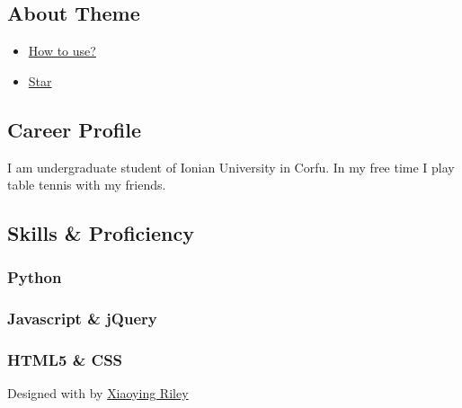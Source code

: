 \documentclass[
]{article}
\providecommand{\tightlist}{%
  \setlength{\itemsep}{0pt}\setlength{\parskip}{0pt}}
\begin{document}
\hypertarget{about-theme}{%
\subsection{About Theme}\label{about-theme}}

\begin{itemize}
\tightlist
\item
  \href{https://www.youtube.com/watch?v=Jnmj1dXDbNk}{How to use?}
\item
  \href{https://github.com/sharu725/online-cv}{Star}
\end{itemize}

\hypertarget{career-profile}{%
\subsection{\texorpdfstring{{ \emph{} \emph{} } Career
Profile}{    Career Profile}}\label{career-profile}}

I am undergraduate student of Ionian University in Corfu. In my free
time I play table tennis with my friends.

\hypertarget{skills-proficiency}{%
\subsection{\texorpdfstring{{ \emph{} \emph{} } Skills \&
Proficiency}{    Skills \& Proficiency}}\label{skills-proficiency}}

\hypertarget{python}{%
\subsubsection{Python}\label{python}}

\hypertarget{javascript-jquery}{%
\subsubsection{Javascript \& jQuery}\label{javascript-jquery}}

\hypertarget{html5-css}{%
\subsubsection{HTML5 \& CSS}\label{html5-css}}

{Designed with \emph{} by \href{http://themes.3rdwavemedia.com}{Xiaoying
Riley}}
\end{document}
